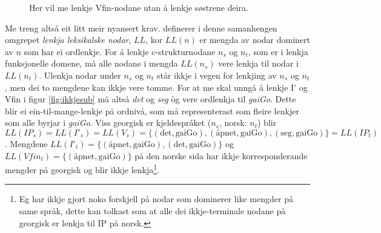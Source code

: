 \documentclass[11pt,a4paper,oneside,draft]{book}
\begin{document}
    \begin{figure}[htp]
    \centering
    
    
    \caption{Her vil me lenkje Vfin-nodane utan å lenkje søstrene deira.}
     \label{fig:enkelsub2}
    \end{figure}

Me treng altså eit litt meir nyansert
krav. \citet[s.~77]{dyvik2009lmp} definerer i denne samanhengen
omgrepet \emph{lenkja leksikalske nodar}, $LL$, kor $LL(n)$ er mengda av
nodar dominert av $n$ som har ei ordlenkje. For å lenkje
c-strukturnodane $n_s$ og $n_t$, som er i lenkja funksjonelle domene,
må alle nodane i mengda $LL(n_s)$ vere lenkja til nodar i
$LL(n_t)$. Ulenkja nodar under $n_s$ og $n_t$ står ikkje i vegen for
lenkjing av $n_s$ og $n_t$, men dei to mengdene kan ikkje vere tomme.
For at me skal unngå å lenkje I' og Vfin i figur \ref{fig:ikkjesub} må
altså \emph{det} og \emph{seg} òg vere ordlenkja til \emph{gaiGo}. Dette blir ei
ein-til-mange-lenkje på ordnivå, som må representerast som fleire
lenkjer som alle byrjar i \emph{gaiGo}. Viss georgisk er kjeldespråket
($n_s$, norsk: $n_t$) blir
$LL(IP_s)=LL(I'_s)=LL(V_s)=\{(\text{det},\text{gaiGo}),(\text{åpnet},\text{gaiGo}),(\text{seg},\text{gaiGo})\}=LL(IP_t)$.
Mengdene
$LL(I'_t)=\{(\text{åpnet},\text{gaiGo}),(\text{det},\text{gaiGo})\}$
og $LL(Vfin_t)=\{(\text{åpnet},\text{gaiGo})\}$ på den norske sida har
ikkje korresponderande mengder på georgisk og blir ikkje lenkja\footnote{Eg har ikkje gjort noko forskjell på nodar som dominerer like
       mengder på same språk, dette kan tolkast som at alle dei
       ikkje-terminale nodane på georgisk er lenkja til IP på norsk. }.
\end{document}
